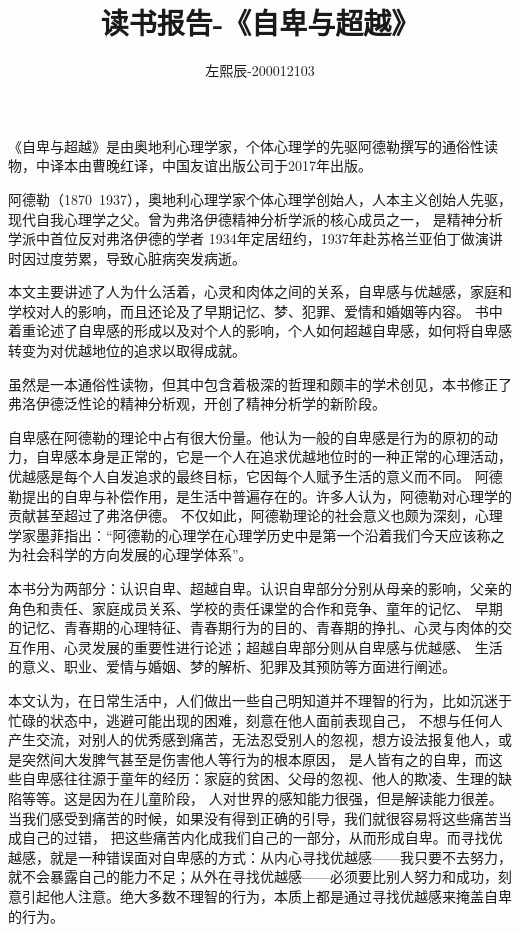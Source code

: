 \documentclass[UTF8]{ctexart}
\title{读书报告-《自卑与超越》}
\author{左熙辰-200012103}
\date{}
\begin{document}
    \maketitle
    《自卑与超越》是由奥地利心理学家，个体心理学的先驱阿德勒撰写的通俗性读物，中译本由曹晚红译，中国友谊出版公司于2017年出版。
    
    阿德勒（1870~1937），奥地利心理学家个体心理学创始人，人本主义创始人先驱，现代自我心理学之父。曾为弗洛伊德精神分析学派的核心成员之一，
    是精神分析学派中首位反对弗洛伊德的学者 1934年定居纽约，1937年赴苏格兰亚伯丁做演讲时因过度劳累，导致心脏病突发病逝。

    本文主要讲述了人为什么活着，心灵和肉体之间的关系，自卑感与优越感，家庭和学校对人的影响，而且还论及了早期记忆、梦、犯罪、爱情和婚姻等内容。
    书中着重论述了自卑感的形成以及对个人的影响，个人如何超越自卑感，如何将自卑感转变为对优越地位的追求以取得成就。

    虽然是一本通俗性读物，但其中包含着极深的哲理和颇丰的学术创见，本书修正了弗洛伊德泛性论的精神分析观，开创了精神分析学的新阶段。

    自卑感在阿德勒的理论中占有很大份量。他认为一般的自卑感是行为的原初的动力，自卑感本身是正常的，它是一个人在追求优越地位时的一种正常的心理活动，
    优越感是每个人自发追求的最终目标，它因每个人赋予生活的意义而不同。
    阿德勒提出的自卑与补偿作用，是生活中普遍存在的。许多人认为，阿德勒对心理学的贡献甚至超过了弗洛伊德。
    不仅如此，阿德勒理论的社会意义也颇为深刻，心理学家墨菲指出：“阿德勒的心理学在心理学历史中是第一个沿着我们今天应该称之为社会科学的方向发展的心理学体系”。


    本书分为两部分：认识自卑、超越自卑。认识自卑部分分别从母亲的影响，父亲的角色和责任、家庭成员关系、学校的责任课堂的合作和竞争、童年的记忆、
    早期的记忆、青春期的心理特征、青春期行为的目的、青春期的挣扎、心灵与肉体的交互作用、心灵发展的重要性进行论述；超越自卑部分则从自卑感与优越感、
    生活的意义、职业、爱情与婚姻、梦的解析、犯罪及其预防等方面进行阐述。

    本文认为，在日常生活中，人们做出一些自己明知道并不理智的行为，比如沉迷于忙碌的状态中，逃避可能出现的困难，刻意在他人面前表现自己，
    不想与任何人产生交流，对别人的优秀感到痛苦，无法忍受别人的忽视，想方设法报复他人，或是突然间大发脾气甚至是伤害他人等行为的根本原因，
    是人皆有之的自卑，而这些自卑感往往源于童年的经历：家庭的贫困、父母的忽视、他人的欺凌、生理的缺陷等等。这是因为在儿童阶段，
    人对世界的感知能力很强，但是解读能力很差。当我们感受到痛苦的时候，如果没有得到正确的引导，我们就很容易将这些痛苦当成自己的过错，
    把这些痛苦内化成我们自己的一部分，从而形成自卑。而寻找优越感，就是一种错误面对自卑感的方式：从内心寻找优越感——我只要不去努力，
    就不会暴露自己的能力不足；从外在寻找优越感——必须要比别人努力和成功，刻意引起他人注意。绝大多数不理智的行为，本质上都是通过寻找优越感来掩盖自卑的行为。
\end{document}
